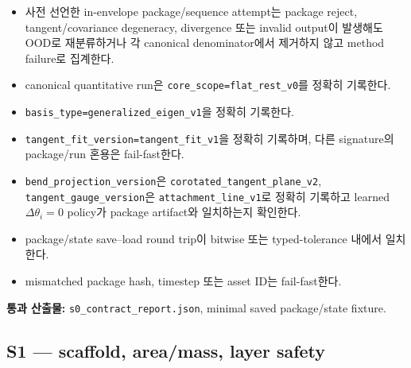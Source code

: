 \documentclass[10pt]{article}
\newcommand{\code}[1]{{\small\nolinkurl{#1}}}
\newcommand{\pass}[1]{\textcolor{GateGreen}{\textbf{#1}}}
\begin{document}
\begin{itemize}
  \item [\(\square\)] 사전 선언한 in-envelope package/sequence attempt는 package reject,
  tangent/covariance degeneracy, divergence 또는 invalid output이 발생해도 OOD로 재분류하거나
  각 canonical denominator에서 제거하지 않고 method failure로 집계한다.
  \item [\(\square\)] canonical quantitative run은
  \code{core\_scope=flat\_rest\_v0}를 정확히 기록한다.
  \item [\(\square\)] \code{basis\_type=generalized\_eigen\_v1}을 정확히 기록한다.
  \item [\(\square\)] \code{tangent\_fit\_version=tangent\_fit\_v1}을 정확히 기록하며,
  다른 signature의 package/run 혼용은 fail-fast한다.
  \item [\(\square\)] \code{bend\_projection\_version}은
  \code{corotated\_tangent\_plane\_v2},
  \code{tangent\_gauge\_version}은 \code{attachment\_line\_v1}로 정확히 기록하고
  learned \(\Delta\theta_i=0\) policy가 package artifact와 일치하는지 확인한다.
  \item [\(\square\)] package/state save--load round trip이 bitwise 또는 typed-tolerance 내에서 일치한다.
  \item [\(\square\)] mismatched package hash, timestep 또는 asset ID는 fail-fast한다.
\end{itemize}

\pass{통과 산출물:} \code{s0\_contract\_report.json}, minimal saved package/state fixture.

\subsection{S1 --- scaffold, area/mass, layer safety}
\end{document}
